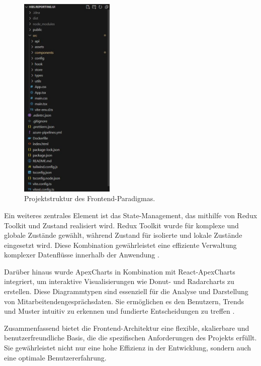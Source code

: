\begin{figure}[h!] \centering \includegraphics[width=0.4\textwidth]{images/frontendparadigma.jpg} \caption{Projektstruktur des Frontend-Paradigmas.} \label{fig:frontend_code_paradigm} \end{figure}

Ein weiteres zentrales Element ist das State-Management, das mithilfe von Redux Toolkit und Zustand realisiert wird. Redux Toolkit wurde für komplexe und globale Zustände gewählt, während Zustand für isolierte und lokale Zustände eingesetzt wird. Diese Kombination gewährleistet eine effiziente Verwaltung komplexer Datenflüsse innerhalb der Anwendung \cite{reduxToolkit}.

Darüber hinaus wurde ApexCharts in Kombination mit React-ApexCharts integriert, um interaktive Visualisierungen wie Donut- und Radarcharts zu erstellen. Diese Diagrammtypen sind essenziell für die Analyse und Darstellung von Mitarbeitendengesprächsdaten. Sie ermöglichen es den Benutzern, Trends und Muster intuitiv zu erkennen und fundierte Entscheidungen zu treffen \cite{apexchartsDoc}.

Zusammenfassend bietet die Frontend-Architektur eine flexible, skalierbare und benutzerfreundliche Basis, die die spezifischen Anforderungen des Projekts erfüllt. Sie gewährleistet nicht nur eine hohe Effizienz in der Entwicklung, sondern auch eine optimale Benutzererfahrung.

